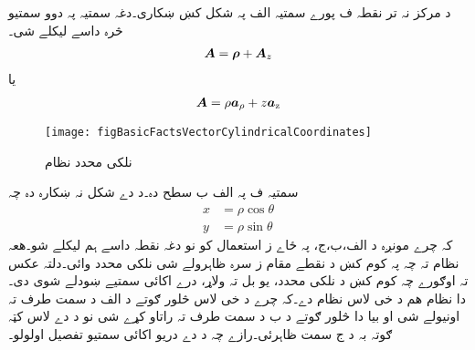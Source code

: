  د مرکز نہ  تر نقطہ ف پورے سمتیہ الف پہ شکل کښ ښکاری۔دغہ سمتیہ پہ دوو سمتیو څرہ داسے لیکلے شی۔
\begin{align}
{\ensuremath{{\boldsymbol{A}}}}={{\boldsymbol{\rho}}}+{{\boldsymbol{A}}}_z
\end{align}
یا
\begin{align}
{\ensuremath{{\boldsymbol{A}}}}=\rho {\boldsymbol{a}}_{\rho}+z {\boldsymbol{a}}_{\textup{z}}
\end{align}
%
\begin{figure}
\centering
\texttt{[image: figBasicFactsVectorCylindricalCoordinates]}
\caption{نلکی محدد نظام}
\label{شکل_حقائق_نلکی_نظام_ایک_سمتیہ}
\end{figure}
 سمتیہ ف پہ الف ب سطح دہ۔د دے شکل نہ ښکارہ دہ چہ
\begin{align}
x&=\rho \cos \theta\\
y&=\rho \sin \theta
\end{align}
کہ چرے مونږہ د الف،ب،ج، پہ ځاے ز استعمال کو نو دغہ نقطہ داسے ہم لیکلے شو۔ھعہ نظام تہ چہ پہ کوم کښ د نقطے مقام ز سرہ ظاہرولے شی نلکی محدد وائی۔دلتہ عکس تہ اوګورے چہ کوم کښ د نلکی محدد، یو بل تہ ولاړ، درے اکائی سمتیے ښودلے شوی دی۔دا نظام ھم د خی لاس  نظام دے۔کہ چرے د خی لاس څلور ګوتے د الف د سمت طرف تہ اونیولے شی او بیا دا څلور ګوتے د ب د سمت طرف تہ راتاو کړے شی نو د دے لاس کټہ ګوتہ بہ د ج سمت ظاہرئی۔رازے چہ د دے دریو اکائی سمتیو تفصیل اولولو۔

